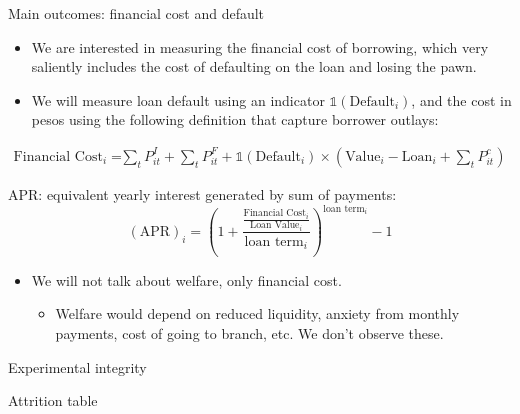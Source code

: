 \documentclass[8pt]{beamer}
\begin{document}
\begin{frame}{Main outcomes: financial cost and default}
\label{fc_outcome}
\begin{itemize}
    \item We are interested in measuring the financial cost of borrowing, which very saliently includes the cost of defaulting on the loan and losing the pawn.
    \item We will measure loan default using an indicator $\mathds{1}(\text{Default}_i)$, and the cost in pesos using the following definition that capture borrower outlays:
\end{itemize}

\begin{align*}
    \text{Financial Cost}_i =&  \sum_t P^I_{it} +\sum_t P^F_{it}  
     + \mathds{1}(\text{Default}_i) \times \left(\text{Value}_i-\text{Loan}_i + \sum_t P^c_{it}\right)
\end{align*}

\vspace{.2in}
\: \: \: \: APR: equivalent yearly interest generated by sum of payments:
   \begin{equation*}
    (\text{APR})_i =\left( 1 + \frac{\frac{\text{Financial Cost}_i}{\text{Loan Value}_i}}{\text{loan term}_i}\right)^{\text{loan term}_i}-1 
\end{equation*}

   \vspace{.2in}
\begin{itemize}
    \item We \alert{will not talk about welfare}, only financial cost.
    \begin{itemize}
        \item Welfare would depend on reduced liquidity, anxiety from monthly payments, cost of going to branch, etc. We don't observe these.
    \end{itemize}
\end{itemize}
\end{frame}










\begin{frame}{Experimental integrity}
\label{experimental_integrity}
    \begin{table}[H]
\caption{Attrition table}
\label{attrition_table}
\begin{center}
\small{}
\end{center}
\end{table}
\end{frame}
\end{document}
